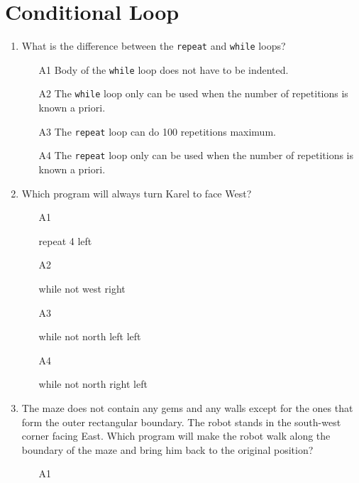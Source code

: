 
\section{Conditional Loop}

\begin{enumerate}
\item What is the difference between the {\tt repeat} and {\tt while} loops?
\begin{enumerate}
\item[A1] Body of the {\tt while} loop does not have to be indented.
\item[A2] The {\tt while} loop only can be used when the number of repetitions is known a priori.
\item[A3] The {\tt repeat} loop can do 100 repetitions maximum.
\item[A4] The {\tt repeat} loop only can be used when the number of repetitions is known a priori.
\end{enumerate}
\item Which program will always turn Karel to face West?
\begin{enumerate}
\item[A1] 
\begin{bluecode}
repeat 4
    left
\end{bluecode}
\item[A2] 
\begin{bluecode}
while not west
    right
\end{bluecode}
\item[A3] 
\begin{bluecode}
while not north
    left
left
\end{bluecode}
\item[A4] 
\begin{bluecode}
while not north 
    right
left
\end{bluecode}
\end{enumerate}
\item The maze does not contain any gems and any walls except for the ones that 
      form the outer rectangular boundary.
      The robot stands in the south-west corner facing East. Which program will 
      make the robot walk along the 
      boundary of the maze and bring him back to the original position?
\begin{enumerate}
\item[A1] 
\begin{bluecode}

\end{bluecode}
\end{enumerate}
\end{enumerate}
